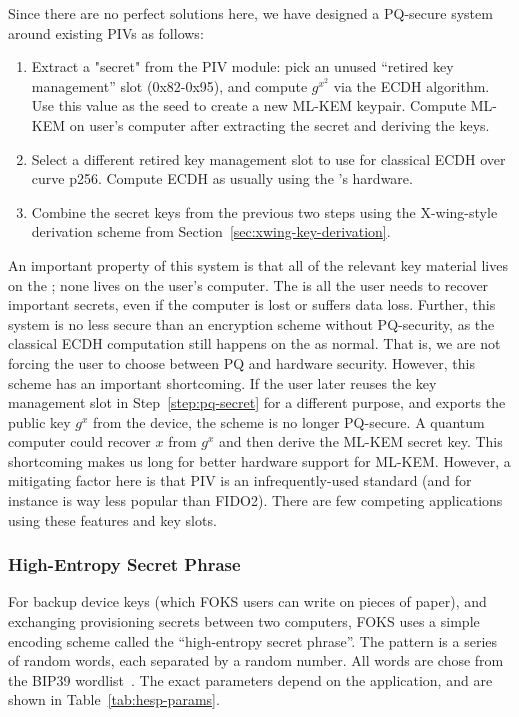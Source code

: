 Since there are no perfect solutions here, we have designed a PQ-secure system
around existing PIVs as follows:

\begin{enumerate}
  \item Extract a "secret" from the PIV module: pick an unused ``retired key management'' slot
  (0x82-0x95), and compute $g^{x^2}$ via the ECDH algorithm. Use this value as the seed
  to create a new ML-KEM keypair. Compute ML-KEM on user's computer after extracting the secret
  and deriving the keys.
  \label{step:pq-secret}

  \item Select a different retired key management slot to use for classical ECDH over curve p256.
  Compute ECDH as usually using the \yubi's hardware.

  \item  Combine the secret keys from the previous two steps using the X-wing-style
  derivation scheme from Section~\ref{sec:xwing-key-derivation}.
\end{enumerate}

An important property of this system is that all of the relevant key material
lives on the \yubi ; none lives on the user's computer. The \yubi{} is all the
user needs to recover important secrets, even if the computer is lost or suffers
data loss. Further, this system is no less secure than an encryption scheme
without PQ-security, as the classical ECDH computation still happens on the
\yubi{} as normal. That is, we are not forcing the user to choose between PQ and
hardware security.  However, this scheme has an important shortcoming. If the
user later reuses the key management slot in Step~\ref{step:pq-secret} for a
different purpose, and exports the public key $g^x$ from the device, the scheme
is no longer PQ-secure.  A quantum computer could recover $x$ from $g^x$ and
then derive the ML-KEM secret key.  This shortcoming makes us long for better
hardware support for ML-KEM.  However, a mitigating factor here is that PIV is
an infrequently-used standard (and for instance is way less popular than FIDO2).
There are few competing applications using these features and key slots.

\subsubsection{High-Entropy Secret Phrase}
\label{sec:hesp}

For backup device keys (which FOKS users can write on pieces of paper), and 
exchanging provisioning secrets between two computers, FOKS uses a simple
encoding scheme called the ``high-entropy secret phrase''. The pattern is 
a series of random words, each separated by a random number. All
words are chose from the BIP39 wordlist~\cite{bip39}. The exact
parameters depend on the application, and are shown in Table~\ref{tab:hesp-params}.


